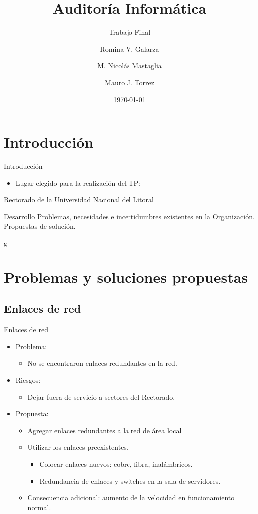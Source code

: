 \documentclass[spanish]{beamer}
\title{Auditoría Informática}
\subtitle{Trabajo Final}
\author{Romina V. Galarza \and M. Nicolás Mastaglia \and Mauro J. Torrez}
\date{\today}
\begin{document}

\section{Introducción}

\begin{frame}{Introducción}
    \begin{itemize}
    \item Lugar elegido para la realización del TP:
    \end{itemize}
Rectorado de la Universidad Nacional del Litoral
\end{frame}


\begin{frame}{Desarrollo}
  \large Problemas, necesidades e incertidumbres existentes en la
  Organización. Propuestas de solución.
\end{frame}
g

\section{Problemas y soluciones propuestas}

\subsection{Enlaces de red}

\begin{frame}{Enlaces de red}
  \begin{itemize}
  \item Problema:
    \begin{itemize}
    \item No se encontraron enlaces redundantes en la red.
    \end{itemize}
  \item Riesgos:
    \begin{itemize}
    \item Dejar fuera de servicio a sectores del Rectorado.
    \end{itemize}
  \item Propuesta:
    \begin{itemize}
    \item Agregar enlaces redundantes a la red de área local
        \item Utilizar los enlaces preexistentes.
          \begin{itemize}
          \item Colocar enlaces nuevos: cobre, fibra, inalámbricos.
          \item Redundancia de enlaces y switches en la sala de
            servidores.
          \end{itemize}
        \item Consecuencia adicional: aumento de la velocidad en
          funcionamiento normal.
    \end{itemize}
  \end{itemize}
\end{frame}
\end{document}

